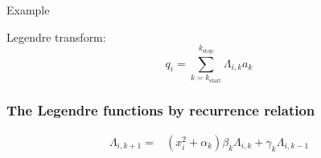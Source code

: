 \documentclass[sans,mathserif]{beamer}
\begin{document}
\begin{frame}{Example}

Legendre transform:
\[
q_{i} = \sum_{k = k_\mathrm{start}}^{k_\mathrm{stop}} \Lambda_{i,k} a_{k}
\]


\end{frame}

\renewcommand{\P}{\widetilde{P}}
\begin{frame}
  \frametitle{The Legendre functions by recurrence relation}

 \begin{equation*}
    \begin{split}
        \Lambda_{i,k+1} =& (x_i^2 + \alpha_{k}) \beta_{k} \Lambda_{i,k}
        + \gamma_{k} \Lambda_{i,k-1}
      \end{split}
    \end{equation*}


\end{frame}
\end{document}
